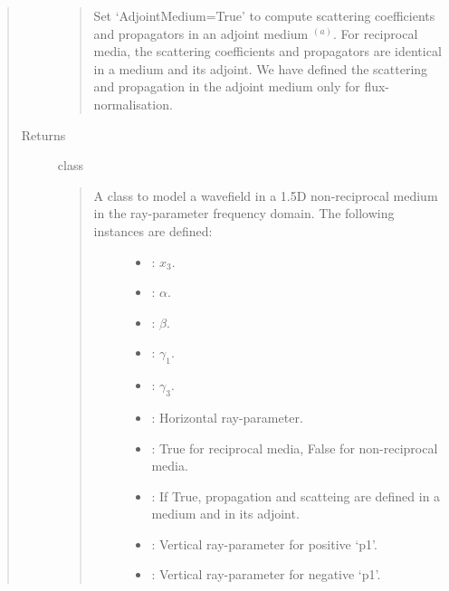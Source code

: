 \documentclass[letterpaper,10pt,english]{sphinxmanual}
\begin{document}
\begin{fulllineitems}
\begin{quote}
\begin{description}
\begin{quote}
Set ‘AdjointMedium=True’ to compute scattering coefficients and propagators in an adjoint medium \(^{(a)}\). For reciprocal media, the scattering coefficients and propagators are identical in a medium and its adjoint. We have defined the scattering and propagation in the adjoint medium only for flux-normalisation.
\end{quote}

\item[{Returns}] \leavevmode
class
\begin{quote}
\begin{description}
\item[{A class to model a wavefield in a 1.5D non-reciprocal medium in the ray-parameter frequency domain. The following instances are defined:}] \leavevmode\begin{itemize}
\item {} 
: \(x_3\).

\end{itemize}
\begin{itemize}
\item {} 
: \(\alpha\).

\item {} 
: \(\beta\).

\item {} 
: \(\gamma_1\).

\item {} 
: \(\gamma_3\).

\item {} 
: Horizontal ray-parameter.

\item {} 
: True for reciprocal media, False for non-reciprocal media.

\item {} 
: If True, propagation and scatteing are defined in a medium and in its adjoint.

\item {} 
: Vertical ray-parameter for positive ‘p1’.

\item {} 
: Vertical ray-parameter for negative ‘p1’.

\end{itemize}

\end{description}
\end{quote}


\end{description}
\end{quote}
\end{fulllineitems}
\end{document}
